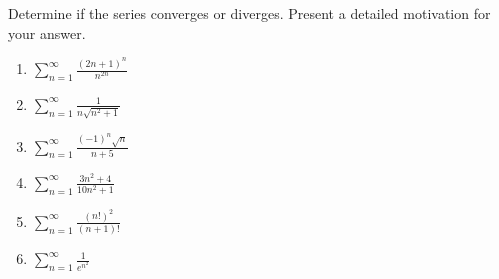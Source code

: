 Determine if the series converges or diverges. Present a detailed motivation for your answer. 

\begin{enumerate}
\item $\displaystyle\sum\limits_{n=1}^\infty \frac{(2n+1)^n}{n^{2n}}  $
\item $\displaystyle\sum\limits_{n=1}^\infty \frac{1}{n\sqrt{n^2+1}}  $
\item $\displaystyle\sum\limits_{n=1}^\infty \frac{(-1)^n \sqrt{n}}{n+5}  $
\item $\displaystyle\sum\limits_{n=1}^\infty \frac{3n^2+4}{10n^2+1} $
\item $\displaystyle\sum\limits_{n=1}^\infty \frac{(n!)^2}{(n+1)!} $
\item $\displaystyle\sum\limits_{n=1}^\infty \frac{1}{e^{n^2}} $

\end{enumerate}